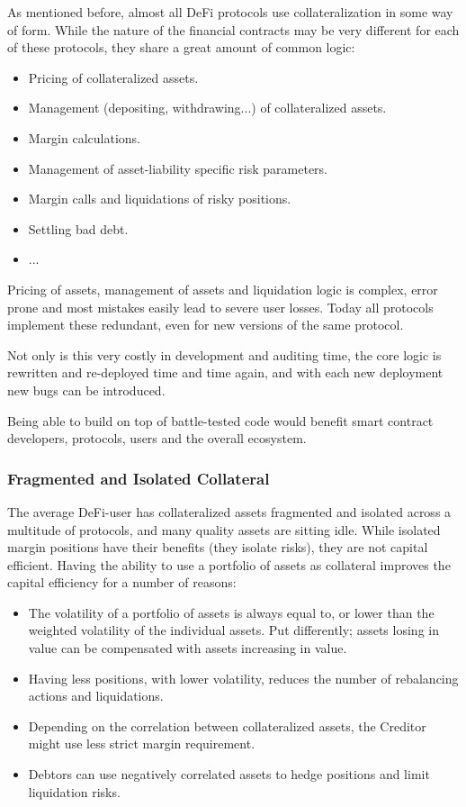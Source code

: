 \documentclass[sigconf,nonacm]{acmart}
\begin{document}
As mentioned before, almost all DeFi protocols use collateralization in some way of form.
While the nature of the financial contracts may be very different for each of these protocols, they share a great amount of common logic:
\begin{itemize}
    \item Pricing of collateralized assets.
    \item Management (depositing, withdrawing...) of collateralized assets.
    \item Margin calculations.
    \item Management of asset-liability specific risk parameters.
    \item Margin calls and liquidations of risky positions.
    \item Settling bad debt.
    \item ...
\end{itemize}

Pricing of assets, management of assets and liquidation logic is complex, error prone and most mistakes easily lead to severe user losses.
Today all protocols implement these redundant, even for new versions of the same protocol.

Not only is this very costly in development and auditing time, the core logic is rewritten and re-deployed time and time again,
and with each new deployment new bugs can be introduced.

Being able to build on top of battle-tested code would benefit smart contract developers, protocols, users and the overall ecosystem.

\subsubsection{Fragmented and Isolated Collateral}
\label{subsubsec:fragmented-collateral}

The average DeFi-user has collateralized assets fragmented and isolated across a multitude of protocols, and many quality assets are sitting idle.
While isolated margin positions have their benefits (they isolate risks), they are not capital efficient.
Having the ability to use a portfolio of assets as collateral improves the capital efficiency for a number of reasons:
\begin{itemize}
    \item The volatility of a portfolio of assets is always equal to, or lower than the weighted volatility of the individual assets.
    Put differently; assets losing in value can be compensated with assets increasing in value.
    \item Having less positions, with lower volatility, reduces the number of rebalancing actions and liquidations.
    \item Depending on the correlation between collateralized assets, the Creditor might use less strict margin requirement.
    \item Debtors can use negatively correlated assets to hedge positions and limit liquidation risks.
\end{itemize}
\end{document}
